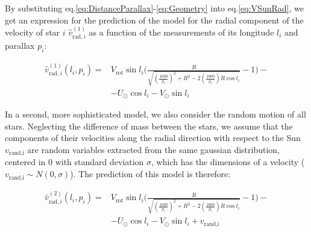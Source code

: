 


\noindent
By substituting eq.\ref{eq:DistanceParallax}-\ref{eq:Geometry} into eq.\ref{eq:VSunRad}, we get an expression for the prediction of the model for the radial component of the velocity of star $i$ $\hat{v}_{\text{rad},i}^{(1)}$ as a function of the measurements of its longitude $l_i$ and parallax $p_i$:

\begin{equation}\label{eq:VradModel1}
    \begin{aligned}
        \hat{v}_{\text{rad},i}^{(1)}(l_i, p_i) =&  V_{\text{rot}}\sin l_i \biggl( \frac{R}{\sqrt{(\frac{1000}{p_i})^2 + R^2 - 2(\frac{1000}{p_i})R \cos l_i}}-1 \biggr) -\\
        &- U_{\odot}\cos l_i - V_{\odot}\sin l_i
    \end{aligned}
\end{equation}

In a second, more sophisticated model, we also consider the random motion of all stars. Neglecting the difference of mass between the stars, we assume that the components of their velocities along the radial direction with respect to the Sun $v_{\text{rand,i}}$ are random variables extracted from the same gaussian distribution, centered in 0 with standard deviation $\sigma$, which has the dimensions of a velocity ($v_{\text{rand,i}} \sim N(0, \sigma)$). The prediction of this model is therefore:

\begin{equation}\label{eq:VradModel2}
    \begin{aligned}
        \hat{v}_{\text{rad},i}^{(2)}(l_i, p_i) =&  V_{\text{rot}}\sin l_i \biggl( \frac{R}{\sqrt{(\frac{1000}{p_i})^2 + R^2 - 2(\frac{1000}{p_i})R \cos l_i}}-1 \biggr) -\\
        &- U_{\odot}\cos l_i - V_{\odot}\sin l_i + v_{\text{rand,i}}
    \end{aligned}
\end{equation}
